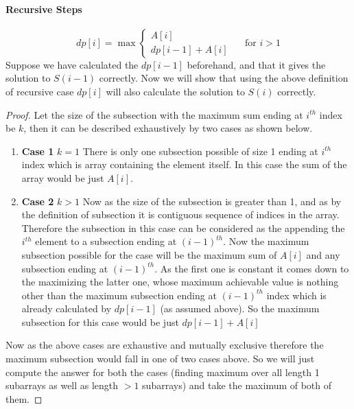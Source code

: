 \documentclass[answers]{exam}
\begin{document}
\begin{questions}
\begin{solution}
\paragraph{Recursive Steps} 
\[
        dp[i] = \max
        \begin{cases}
            A[i]\\
            dp[i-1]+A[i] 
        \end{cases}
        \quad \text{ for } i > 1
\]
Suppose we have calculated the $dp[i-1]$ beforehand, and that it gives the solution to $S(i-1)$ correctly. Now we will show that using the above definition of recursive case $dp[i]$ will also calculate the solution to $S(i)$ correctly.
\begin{proof}
Let the size of the subsection with the maximum sum ending at $i^{th}$ index be $k$, then it can be described exhaustively by two cases as shown below.
\begin{enumerate}
    \item \textbf{Case 1} $k = 1$
    \newline There is only one subsection possible of size 1 ending at $i^{th}$ index which is array containing the element itself. In this case the sum of the array would be just $A[i]$.
    \item \textbf{Case 2} $k>1$
    \newline Now as the size of the subsection is greater than 1, and as by the definition of subsection it is contiguous sequence of indices in the array. Therefore the subsection in this case can be considered as the appending the $i^{th}$ element to a subsection ending at $(i-1)^{th}$. 
    \newline Now the maximum subsection possible for the case will be the maximum sum of $A[i]$ and any subsection ending at $(i-1)^{th}$. As the first one is constant it comes down to the maximizing the latter one, whose maximum achievable value is nothing other than the maximum subsection ending at $(i-1)^{th}$ index which is already calculated by $dp[i-1]$ (as assumed above). 
    \newline So the maximum subsection for this case would be just $dp[i-1]+A[i]$
\end{enumerate}

Now as the above cases are exhaustive and mutually exclusive therefore the maximum subsection would fall in one of two cases above. So we will just compute the answer for both the cases (finding maximum over all length 1 subarrays as well as length $> 1$ subarrays) and take the maximum of both of them.
\end{proof}

\end{solution}
\end{questions}
\end{document}
